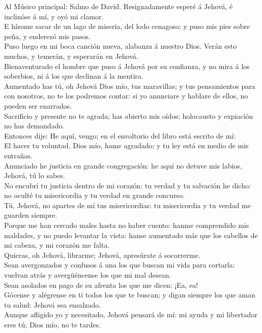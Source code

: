  Al Músico principal: Salmo de David. Resignadamente
esperé á Jehová, é inclinóse á mí, y oyó mi clamor.\\
 E hízome sacar de un lago de miseria, del lodo cenagoso;
y puso mis pies sobre peña, y enderezó mis pasos.\\
 Puso luego en mi boca canción nueva, alabanza á nuestro
Dios. Verán esto muchos, y temerán, y esperarán en Jehová.\\
 Bienaventurado el hombre que puso á Jehová por su
confianza, y no mira á los soberbios, ni á los que declinan á la
mentira.\\
 Aumentado has tú, oh Jehová Dios mío, tus maravillas; y
tus pensamientos para con nosotros, no te los podremos contar: si yo
anunciare y hablare de ellos, no pueden ser enarrados.\\
 Sacrificio y presente no te agrada; has abierto mis
oídos; holocausto y expiación no has demandado.\\
 Entonces dije: He aquí, vengo; en el envoltorio del libro
está escrito de mí:\\
 El hacer tu voluntad, Dios mío, hame agradado; y tu ley
está en medio de mis entrañas.\\
 Anunciado he justicia en grande congregación: he aquí no
detuve mis labios, Jehová, tú lo sabes.\\
 No encubrí tu justicia dentro de mi corazón: tu verdad y
tu salvación he dicho: no oculté tu misericordia y tu verdad en grande
concurso.\\
 Tú, Jehová, no apartes de mí tus misericordias: tu
misericordia y tu verdad me guarden siempre.\\
 Porque me han cercado males hasta no haber cuento: hanme
comprendido mis maldades, y no puedo levantar la vista: hanse aumentado
más que los cabellos de mi cabeza, y mi corazón me falta.\\
 Quieras, oh Jehová, librarme; Jehová, apresúrate á
socorrerme.\\
 Sean avergonzados y confusos á una los que buscan mi
vida para cortarla: vuelvan atrás y avergüéncense los que mi mal
desean.\\
 Sean asolados en pago de su afrenta los que me dicen:
¡Ea, ea!\\
 Gócense y alégrense en ti todos los que te buscan; y
digan siempre los que aman tu salud: Jehová sea ensalzado.\\
 Aunque afligido yo y necesitado, Jehová pensará de mí:
mi ayuda y mi libertador eres tú; Dios mío, no te tardes.

